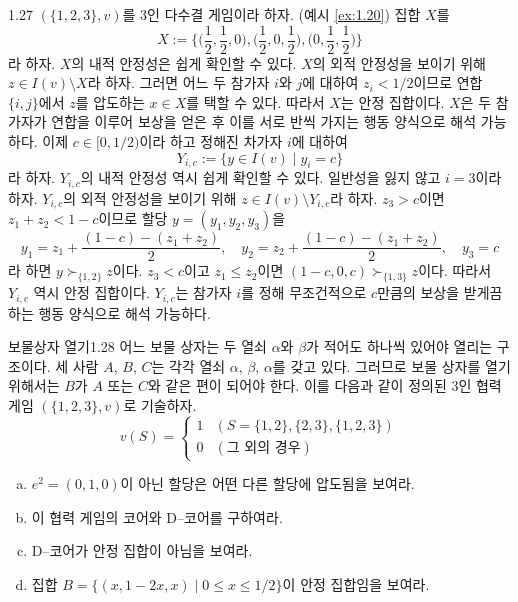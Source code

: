 \documentclass{article}
\numberwithin{equation}{section}
\begin{document}
\begin{example}{}{1.27}
	$(\{1,2,3\},v)$를 $3$인 다수결 게임이라 하자. (예시 \ref{ex:1.20}) 집합 $X$를
	\[
		X:=\biggl\{\biggl(\frac{1}{2},\frac{1}{2},0\biggr),\biggl(\frac{1}{2},0,\frac{1}{2}\biggr),\biggl(0,\frac{1}{2},\frac{1}{2}\biggr)\biggr\}
	\]
	라 하자. $X$의 내적 안정성은 쉽게 확인할 수 있다. $X$의 외적 안정성을 보이기 위해 $z\in I(v)\setminus X$라 하자. 그러면 어느 두 참가자 $i$와 $j$에 대하여 $z_i<1/2$이므로 연합 $\{i,j\}$에서 $z$를 압도하는 $x\in X$를 택할 수 있다. 따라서 $X$는 안정 집합이다. $X$은 두 참가자가 연합을 이루어 보상을 얻은 후 이를 서로 반씩 가지는 행동 양식으로 해석 가능하다. 이제 $c\in[0,1/2)$이라 하고 정해진 차가자 $i$에 대하여
	\[
		Y_{i,c}:=\{y\in I(v)\mid y_i=c\}
	\]
	라 하자. $Y_{i,c}$의 내적 안정성 역시 쉽게 확인할 수 있다. 일반성을 잃지 않고 $i=3$이라 하자. $Y_{i,c}$의 외적 안정성을 보이기 위해 $z\in I(v)\setminus Y_{i,c}$라 하자. $z_3>c$이면 $z_1+z_2<1-c$이므로 할당 $y=(y_1,y_2,y_3)$을
	\[
		y_1=z_1+\frac{(1-c)-(z_1+z_2)}{2},\quad y_2=z_2+\frac{(1-c)-(z_1+z_2)}{2},\quad y_3=c
	\]
	라 하면 $y\succ_{\{1,2\}}z$이다. $z_3<c$이고 $z_1\leq z_2$이면 $(1-c,0,c)\succ_{\{1,3\}}z$이다. 따라서 $Y_{i,c}$ 역시 안정 집합이다. $Y_{i,c}$는 참가자 $i$를 정해 무조건적으로 $c$만큼의 보상을 받게끔 하는 행동 양식으로 해석 가능하다.
\end{example}

\begin{prob}{보물상자 열기}{1.28}
	어느 보물 상자는 두 열쇠 $\alpha$와 $\beta$가 적어도 하나씩 있어야 열리는 구조이다. 세 사람 $A$, $B$, $C$는 각각 열쇠 $\alpha$, $\beta$, $\alpha$를 갖고 있다. 그러므로 보물 상자를 열기 위해서는 $B$가 $A$ 또는 $C$와 같은 편이 되어야 한다. 이를 다음과 같이 정의된 $3$인 협력 게임 $(\{1,2,3\},v)$로 기술하자.
	\[
		v(S)=\begin{cases}
			1 & (S=\{1,2\},\{2,3\},\{1,2,3\})\\
			0 & (\text{그 외의 경우})
		\end{cases}
	\]
	\begin{enumerate}[(a)]
		\item $e^2=(0,1,0)$이 아닌 할당은 어떤 다른 할당에 압도됨을 보여라.
		\item 이 협력 게임의 코어와 D--코어를 구하여라.
		\item D--코어가 안정 집합이 아님을 보여라.
		\item 집합 $B=\{(x,1-2x,x)\mid0\leq x\leq1/2\}$이 안정 집합임을 보여라.
	\end{enumerate}
\end{prob}
\end{document}
